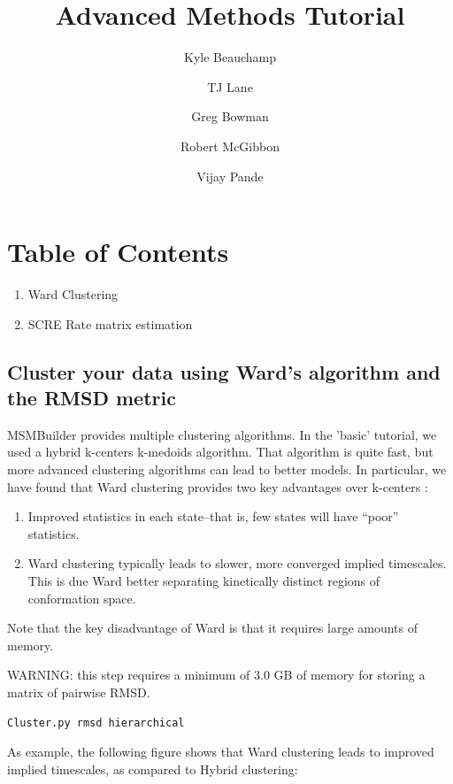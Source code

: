 \documentclass[12pt]{article}
\title
{
Advanced Methods Tutorial
}
\author{Kyle Beauchamp \and TJ Lane \and Greg Bowman \and  Robert McGibbon \and Vijay Pande}
\begin{document}
\maketitle

\section{Table of Contents}
\begin{enumerate}
\item Ward Clustering
\item SCRE Rate matrix estimation
\end{enumerate}

\newpage

\subsection{Cluster your data using Ward's algorithm and the RMSD metric}

MSMBuilder provides multiple clustering algorithms.  In the 'basic' tutorial, we used a hybrid k-centers k-medoids algorithm.  That algorithm is quite fast, but more advanced clustering algorithms can lead to better models.  In particular, we have found that
Ward clustering provides two key advantages over k-centers \cite{beauchamp2012simple}:

\begin{enumerate}
 \item Improved statistics in each state--that is, few states will have ``poor'' statistics.
 \item Ward clustering typically leads to slower, more converged implied timescales.  This is due Ward better separating kinetically distinct regions of conformation space.
\end{enumerate}

Note that the key disadvantage of Ward is that it requires large amounts of memory.  


WARNING: this step requires a minimum of 3.0 GB of memory for storing a matrix of pairwise RMSD.
\begin{verbatim}
Cluster.py rmsd hierarchical
\end{verbatim}

As example, the following figure shows that Ward clustering leads to improved implied timescales, as compared to Hybrid clustering:
\end{document}
